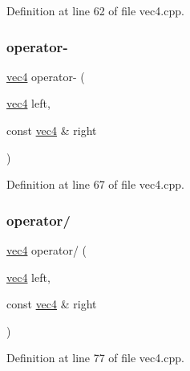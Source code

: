 Definition at line 62 of file vec4.\+cpp.

\mbox{\label{structspork_1_1maths_1_1vec4_aefbcaef8da779dca955172b3245c56b0}} 
\subsubsection{\texorpdfstring{operator-\/}{operator-}}
{\footnotesize\ttfamily \hyperlink{structspork_1_1maths_1_1vec4}{vec4} operator-\/ (\begin{DoxyParamCaption}\item[{\hyperlink{structspork_1_1maths_1_1vec4}{vec4}}]{left,  }\item[{const \hyperlink{structspork_1_1maths_1_1vec4}{vec4} \&}]{right }\end{DoxyParamCaption})\hspace{0.3cm}{\ttfamily [friend]}}



Definition at line 67 of file vec4.\+cpp.

\mbox{\label{structspork_1_1maths_1_1vec4_a5a0b11e86fa22f63a08a7e7c21cfcc83}} 
\subsubsection{\texorpdfstring{operator/}{operator/}}
{\footnotesize\ttfamily \hyperlink{structspork_1_1maths_1_1vec4}{vec4} operator/ (\begin{DoxyParamCaption}\item[{\hyperlink{structspork_1_1maths_1_1vec4}{vec4}}]{left,  }\item[{const \hyperlink{structspork_1_1maths_1_1vec4}{vec4} \&}]{right }\end{DoxyParamCaption})\hspace{0.3cm}{\ttfamily [friend]}}



Definition at line 77 of file vec4.\+cpp.

\mbox{\label{structspork_1_1maths_1_1vec4_a681ad2aa75c7af77ed633bb251150a70}} 
